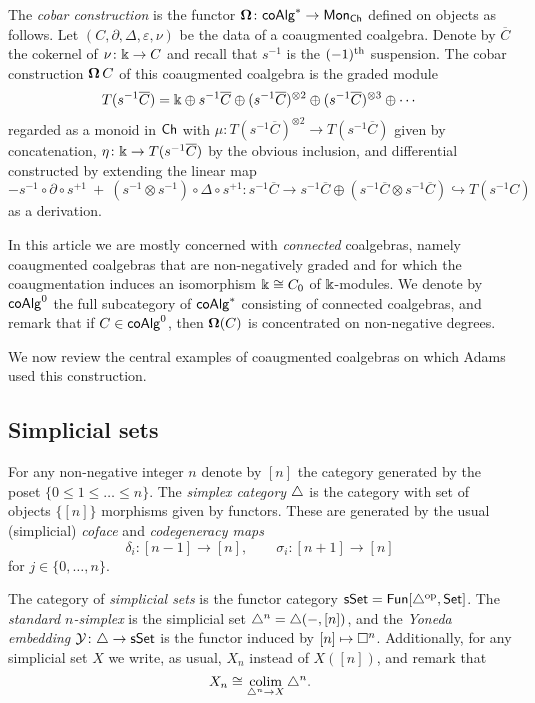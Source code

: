 The \textit{cobar construction} is the functor $\operatorname{\mathbf{\Omega}} \colon \mathsf{coAlg}^\ast \to \mathsf{Mon}_{\mathsf{Ch}}$ defined on objects as follows.
Let $(C, \partial, \Delta, \varepsilon, \nu)$ be the data of a coaugmented coalgebra.
Denote by $\overline{C}$ the cokernel of $\nu \colon \Bbbk \to C$ and recall that $s^{-1}$ is the $(-1)^\mathrm{th}$ suspension.
The cobar construction $\operatorname{\mathbf{\Omega}} C$ of this coaugmented coalgebra is the graded module
\[
T(s^{-1} \overline{C}) = \Bbbk \oplus s^{-1}\overline{C} \oplus (s^{-1}\overline{C})^{\otimes 2} \oplus (s^{-1}\overline{C})^{\otimes 3} \oplus \cdots
\]
regarded as a monoid in $\mathsf{Ch}$ with $\mu \colon T(s^{-1} \overline{C})^{\otimes 2} \to T(s^{-1} \overline{C})$ given by concatenation, $\eta \colon \Bbbk \to T(s^{-1} \overline{C})$ by the obvious inclusion, and differential constructed by extending the linear map
\[
- s^{-1} \circ \partial \circ s^{+1} \ + \ (s^{-1} \otimes s^{-1}) \circ \Delta \circ s^{+1} \colon
s^{-1} \overline{C} \to s^{-1}\overline{C} \oplus (s^{-1}\overline{C} \otimes s^{-1}\overline{C}) \hookrightarrow T(s^{-1}C)
\]
as a derivation.

In this article we are mostly concerned with \textit{connected} coalgebras, namely coaugmented  coalgebras that are non-negatively graded and for which the coaugmentation induces an isomorphism $\Bbbk \cong C_0$ of $\Bbbk$-modules.
We denote by $\mathsf{coAlg}^0$ the full subcategory of $\mathsf{coAlg}^\ast$ consisting of connected coalgebras, and remark that if $C \in \mathsf{coAlg}^0$, then $ \operatorname{\mathbf{\Omega}}(C)$ is concentrated on non-negative degrees.

We now review the central examples of coaugmented coalgebras on which Adams used this construction.

\subsection{Simplicial sets}

For any non-negative integer $n$ denote by $[n]$ the category generated by the poset $\{0 \leq 1 \leq \dots \leq n\}$.
The \textit{simplex category} $\triangle$ is the category with set of objects $\big\{ [n] \big\}$ morphisms given by functors.
These are generated by the usual (simplicial) \textit{coface} and \textit{codegeneracy maps}
\[
\delta_i \colon [n-1] \to [n], \qquad \sigma_i \colon [n+1] \to [n]
\]
for $j \in \{0, \dots, n\}$.

The category of \textit{simplicial sets} is the functor category $\mathsf{sSet} = \mathsf{Fun}[\triangle^{\mathrm{op}}, \mathsf{Set}]$.
The \textit{standard $n$-simplex} is the simplicial set $\triangle^n = \triangle(-, [n])$, and the \textit{Yoneda embedding} $\operatorname{\mathcal{Y}} \colon \triangle \to \mathsf{sSet}$ is the functor induced by $[n] \mapsto \square^n$.
Additionally, for any simplicial set $X$ we write, as usual, $X_n$ instead of $X([n])$, and remark that
\[
X_n \cong \operatorname*{colim}_{\triangle^n \to X} \triangle^n.
\]

